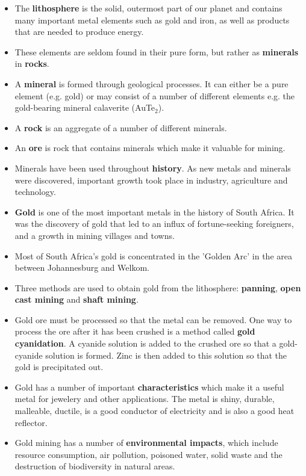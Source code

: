 \begin{itemize}
\item{The \textbf{lithosphere} is the solid, outermost part of our planet and contains many important metal elements such as gold and iron, as well as products that are needed to produce energy.}
\item{These elements are seldom found in their pure form, but rather as \textbf{minerals} in \textbf{rocks}.}
\item{A \textbf{mineral} is formed through geological processes. It can either be a pure element (e.g. gold) or may consist of a number of different elements e.g. the gold-bearing mineral calaverite (AuTe$_{2}$).}
\item{A \textbf{rock} is an aggregate of a number of different minerals.}
\item{An \textbf{ore} is rock that contains minerals which make it valuable for mining.}
\item{Minerals have been used throughout \textbf{history}. As new metals and minerals were discovered, important growth took place in industry, agriculture and technology.}
\item{\textbf{Gold} is one of the most important metals in the history of South Africa. It was the discovery of gold that led to an influx of fortune-seeking foreigners, and a growth in mining villages and towns.}
\item{Most of South Africa's gold is concentrated in the 'Golden Arc' in the area between Johannesburg and Welkom.}
\item{Three methods are used to obtain gold from the lithosphere: \textbf{panning}, \textbf{open cast mining} and \textbf{shaft mining}.}
\item{Gold ore must be processed so that the metal can be removed. One way to process the ore after it has been crushed is a method called \textbf{gold cyanidation}. A cyanide solution is added to the crushed ore so that a gold-cyanide solution is formed. Zinc is then added to this solution so that the gold is precipitated out.}
\item{Gold has a number of important \textbf{characteristics} which make it a useful metal for jewelery and other applications. The metal is shiny, durable, malleable, ductile, is a good conductor of electricity and is also a good heat reflector.}
\item{Gold mining has a number of \textbf{environmental impacts}, which include resource consumption, air pollution, poisoned water, solid waste and the destruction of biodiversity in natural areas.}

\end{itemize}
